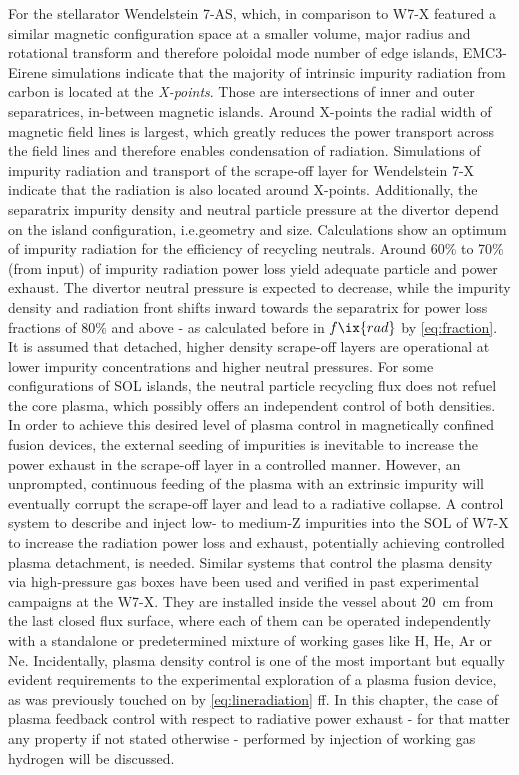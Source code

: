     For the stellarator Wendelstein 7-AS, which, in comparison to W7-X featured a similar magnetic configuration space at a smaller volume, major radius and rotational transform and therefore poloidal mode number of edge islands, EMC3-Eirene simulations indicate that the majority of intrinsic impurity radiation from carbon is located at the \textit{X-points}. Those are intersections of inner and outer separatrices, in-between magnetic islands\cite{Harbour1989}. Around X-points the radial width of magnetic field lines is largest, which greatly reduces the power transport across the field lines and therefore enables condensation of radiation\cite{Feng2005,Thomsen2004}. Simulations of impurity radiation and transport of the scrape-off layer for Wendelstein 7-X indicate that the radiation is also located around X-points. Additionally, the separatrix impurity density and neutral particle pressure at the divertor depend on the island configuration, i.e.geometry and size. Calculations show an optimum of impurity radiation for the efficiency of recycling neutrals. Around 60\% to 70\% (from input) of impurity radiation power loss yield adequate particle and power exhaust. The divertor neutral pressure is expected to decrease, while the impurity density and radiation front shifts inward towards the separatrix for power loss fractions of 80\% and above - as calculated before in $f\ix{rad}$ by \cref{eq:fraction}. It is assumed that detached, higher density scrape-off layers are operational at lower impurity concentrations and higher neutral pressures. For some configurations of SOL islands, the neutral particle recycling flux does not refuel the core plasma, which possibly offers an independent control of both densities\cite{Feng2016}.\\%
    In order to achieve this desired level of plasma control in magnetically confined fusion devices, the external seeding of impurities is inevitable to increase the power exhaust in the scrape-off layer in a controlled manner\cite{Schmitz2020,Pacher2007,Kallenbach2013,Feng2016}. However, an unprompted, continuous feeding of the plasma with an extrinsic impurity will eventually corrupt the scrape-off layer and lead to a radiative collapse. A control system to describe and inject low- to medium-Z impurities into the SOL of W7-X to increase the radiation power loss and exhaust, potentially achieving controlled plasma detachment, is needed. Similar systems that control the plasma density via high-pressure gas boxes have been used and verified in past experimental campaigns at the W7-X. They are installed inside the vessel about \SI{20}{\centi\meter} from the last closed flux surface, where each of them can be operated independently with a standalone or predetermined mixture of working gases like H, He, Ar or Ne. Incidentally, plasma density control is one of the most important but equally evident requirements to the experimental exploration of a plasma fusion device\cite{Hirsch2013,Pedersen2015,Bosch2018}, as was previously touched on by \cref{eq:lineradiation} ff. In this chapter, the case of plasma feedback control with respect to radiative power exhaust - for that matter any property if not stated otherwise - performed by injection of working gas hydrogen will be discussed.\\%
